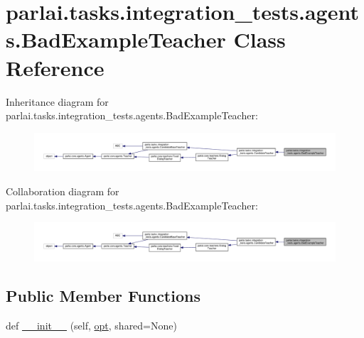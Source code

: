 \hypertarget{classparlai_1_1tasks_1_1integration__tests_1_1agents_1_1BadExampleTeacher}{}\section{parlai.\+tasks.\+integration\+\_\+tests.\+agents.\+Bad\+Example\+Teacher Class Reference}
\label{classparlai_1_1tasks_1_1integration__tests_1_1agents_1_1BadExampleTeacher}


Inheritance diagram for parlai.\+tasks.\+integration\+\_\+tests.\+agents.\+Bad\+Example\+Teacher\+:
\nopagebreak
\begin{figure}[H]
\begin{center}
\leavevmode
\includegraphics[width=350pt]{d6/d32/classparlai_1_1tasks_1_1integration__tests_1_1agents_1_1BadExampleTeacher__inherit__graph}
\end{center}
\end{figure}


Collaboration diagram for parlai.\+tasks.\+integration\+\_\+tests.\+agents.\+Bad\+Example\+Teacher\+:
\nopagebreak
\begin{figure}[H]
\begin{center}
\leavevmode
\includegraphics[width=350pt]{dd/d6f/classparlai_1_1tasks_1_1integration__tests_1_1agents_1_1BadExampleTeacher__coll__graph}
\end{center}
\end{figure}
\subsection*{Public Member Functions}
\begin{DoxyCompactItemize}
\item 
def \hyperlink{classparlai_1_1tasks_1_1integration__tests_1_1agents_1_1BadExampleTeacher_a977f478a2379e0f40525f3dd5408a87c}{\+\_\+\+\_\+init\+\_\+\+\_\+} (self, \hyperlink{classparlai_1_1tasks_1_1integration__tests_1_1agents_1_1CandidateBaseTeacher_a41dc4440360113264f1389783155e841}{opt}, shared=None)
\end{DoxyCompactItemize}
